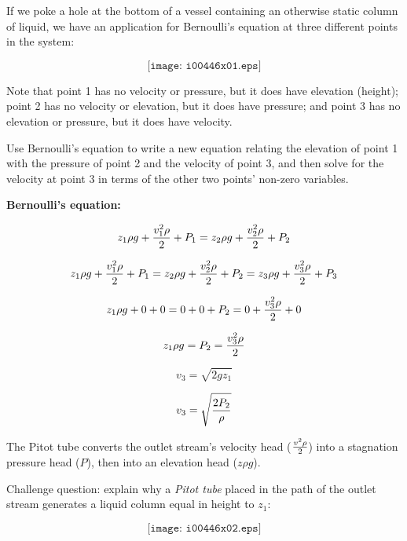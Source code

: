 

If we poke a hole at the bottom of a vessel containing an otherwise static column of liquid, we have an application for Bernoulli's equation at three different points in the system:

$$\texttt{[image: i00446x01.eps]}$$

Note that point 1 has no velocity or pressure, but it does have elevation (height); point 2 has no velocity or elevation, but it does have pressure; and point 3 has no elevation or pressure, but it does have velocity.

Use Bernoulli's equation to write a new equation relating the elevation of point 1 with the pressure of point 2 and the velocity of point 3, and then solve for the velocity at point 3 in terms of the other two points' non-zero variables.

\vskip 10pt

\noindent
{\bf Bernoulli's equation:}

$$z_1 \rho g + {v_1^2 \rho \over 2} + P_1 = z_2 \rho g + {v_2^2 \rho \over 2} + P_2$$







$$z_1 \rho g + {v_1^2 \rho \over 2} + P_1 = z_2 \rho g + {v_2^2 \rho \over 2} + P_2 = z_3 \rho g + {v_3^2 \rho \over 2} + P_3$$

$$z_1 \rho g + 0 + 0 = 0 + 0 + P_2 = 0 + {v_3^2 \rho \over 2} + 0$$

$$z_1 \rho g = P_2 = {v_3^2 \rho \over 2}$$

\vskip 10pt

$$v_3 = \sqrt{2 g z_1}$$

$$v_3 = \sqrt{2 P_2 \over \rho}$$

\vskip 10pt

The Pitot tube converts the outlet stream's velocity head ($v^2 \rho \over 2$) into a stagnation pressure head ($P$), then into an elevation head ($z \rho g$).

\vskip 10pt

Challenge question: explain why a {\it Pitot tube} placed in the path of the outlet stream generates a liquid column equal in height to $z_1$:

$$\texttt{[image: i00446x02.eps]}$$











